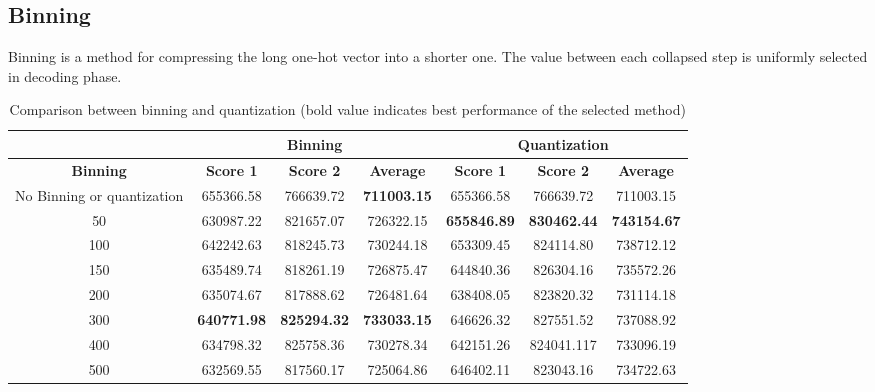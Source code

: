 \documentclass{article}
\begin{document}
\subsection{Binning}

Binning is a method for compressing the long one-hot vector into a shorter one. The value between each collapsed step is uniformly selected in decoding phase. 


\begin{table}[htpb]\centering
	\begin{tabular}{ccccccc}
		\hline
		& \multicolumn{3}{c}{\textbf{Binning}}                         & \multicolumn{3}{c}{\textbf{Quantization}}                    \\ \hline
		\textbf{Binning}           & \textbf{Score 1}   & \textbf{Score 2}   & \textbf{Average}   & \textbf{Score 1}   & \textbf{Score 2}   & \textbf{Average}   \\ \hline
		No Binning or quantization & 655366.58          & 766639.72          & \textbf{711003.15} & 655366.58          & 766639.72          & 711003.15          \\ \hline
		50                         & 630987.22          & 821657.07          & 726322.15          & \textbf{655846.89} & \textbf{830462.44} & \textbf{743154.67} \\ \hline
		100                        & 642242.63          & 818245.73          & 730244.18          & 653309.45          & 824114.80          & 738712.12          \\ \hline
		150                        & 635489.74          & 818261.19          & 726875.47          & 644840.36          & 826304.16          & 735572.26          \\ \hline
		200                        & 635074.67          & 817888.62          & 726481.64          & 638408.05          & 823820.32          & 731114.18          \\ \hline
		300                        & \textbf{640771.98} & \textbf{825294.32} & \textbf{733033.15} & 646626.32          & 827551.52          & 737088.92          \\ \hline
		400                        & 634798.32          & 825758.36          & 730278.34          & 642151.26          & 824041.117         & 733096.19          \\ \hline
		500                        & 632569.55          & 817560.17          & 725064.86          & 646402.11          & 823043.16          & 734722.63          \\ \hline
	\end{tabular}
\caption{Comparison between binning and quantization (bold value indicates best performance of the selected method)}
\label{tab:binbox}
\end{table}
\end{document}
